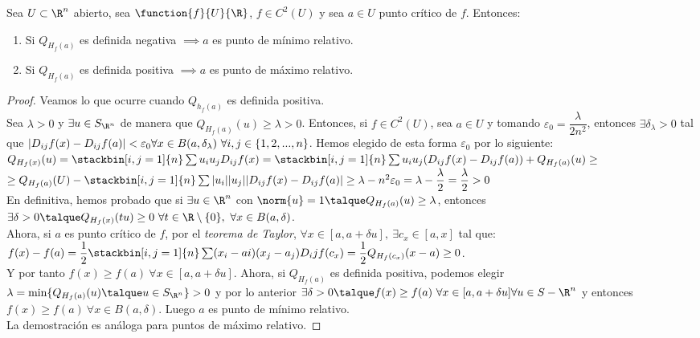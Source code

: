 \begin{proposicion} Sea $U\subset\R^n$ abierto, sea $\function{f}{U}{\R}$, $f\in C^2(U)$ y sea $a\in U$ punto crítico de $f$. Entonces:
\begin{enumerate}[1)]
\item Si $Q_{H_f(a)}$ es definida negativa $\implies a$ es punto de mínimo relativo.
\item Si $Q_{H_f(a)}$ es definida positiva $\implies a$ es punto de máximo relativo.\end{enumerate}
\begin{proof} Veamos lo que ocurre cuando $Q_{h_f(a)}$ es definida positiva.\\
Sea $\lambda>0$ y $\exists u\in S_{\R^n}$ de manera que $Q_{H_f(a)}(u)\geq\lambda>0$. Entonces, si $f\in C^2(U)$, sea $a\in U$ y tomando $\varepsilon_0=\dfrac{\lambda}{2n^2}$, entonces $\exists\delta_\lambda>0$ tal que $|D_{ij}f(x)-D_{ij}f(a)|<\varepsilon_0\\\forall x\in B(a,\delta_\lambda)\ \forall i,j\in\{1,2,...,n\}$. Hemos elegido de esta forma $\varepsilon_0$ por lo siguiente:\\
$Q_{H_f(x)}(u)=\stackbin[i,j=1]{n}\sum u_iu_jD_{ij}f(x)=\stackbin[i,j=1]{n}\sum u_iu_j(D_{ij}f(x)-D_{ij}f(a))+Q_{H_f(a)}(u)\geq$\\
$\geq Q_{H_f(a)}(U)-\stackbin[i,j=1]{n}\sum |u_i||u_j||D_{ij}f(x)-D_{ij}f(a)|\geq \lambda-n^2\varepsilon_0=\lambda-\dfrac{\lambda}{2}=\dfrac{\lambda}{2}>0$\\
En definitiva, hemos probado que si $\exists u\in \R^n$ con $\norm{u}=1\talque Q_{H_f(a)}(u)\geq \lambda$, entonces $\exists\delta>0\talque Q_{H_f(x)}(tu)\geq 0\ \forall t\in \R\setminus\{0\},\ \forall x\in B(a,\delta)$.\\
Ahora, si $a$ es punto crítico de $f$, por el \textit{teorema de Taylor}, $\forall x\in[a,a+\delta u],\ \exists c_x\in[a,x]$ tal que:\\
$f(x)-f(a)=\dfrac{1}{2}\stackbin[i,j=1]{n}\sum(x_i-ai)(x_j-a_j)D_ijf(c_x)=\dfrac{1}{2}Q_{H_f(c_x)}(x-a)\geq 0$.\\
Y por tanto $f(x)\geq f(a)\ \forall x\in[a,a+\delta u]$.
Ahora, si $Q_{H_f(a)}$ es definida positiva, podemos elegir $\lambda=\min\{Q_{H_f(a)}(u)\talque u\in S_{\R^n}\}>0$ y por lo anterior $\exists\delta>0\talque f(x)\geq f(a)\ \forall x\in[a,a+\delta u]\forall u\in S-{\R^n}$ y entonces $f(x)\geq f(a)\ \forall x\in B(a,\delta)$. Luego $a$ es punto de mínimo relativo.\\
La demostración es análoga para puntos de máximo relativo.
\end{proof}
\end{proposicion}

